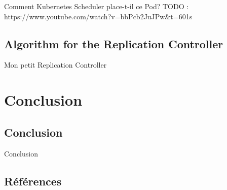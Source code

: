 \documentclass{bredelebeamer}
\begin{document}
\begin{frame}{Comment Kubernetes Scheduler place-t-il ce Pod?}
TODO : https://www.youtube.com/watch?v=bbPcb2JuJPw&t=601s
\end{frame}

\subsection{Algorithm for the Replication Controller}
\begin{frame}{Mon petit Replication Controller}

\end{frame}


\section{Conclusion}
\subsection{Conclusion}
\begin{frame}{Conclusion}

\end{frame}

\subsection{Références}
\end{document}
